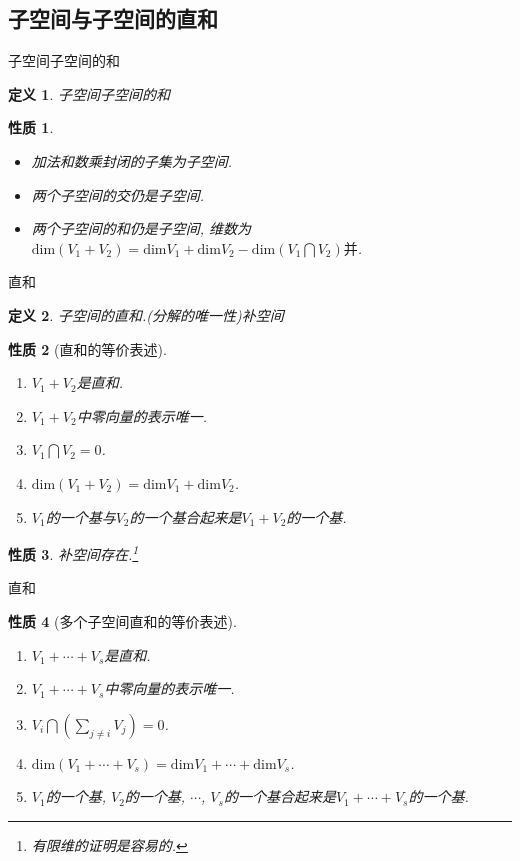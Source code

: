 \documentclass[11pt]{beamer}
\newtheorem{defi}{定义}[section]
\newtheorem{prop}{性质}[section]
\def\dim{\mathrm{dim}}
\begin{document}
\subsection{子空间与子空间的直和}
\frame{\subsectionpage}

\begin{frame}{子空间\quad 子空间的和}
	\begin{defi}
		子空间\quad 子空间的和\quad
	\end{defi}
	\begin{prop}
		\begin{itemize}
			\item 加法和数乘封闭的子集为子空间.
			\item 两个子空间的交仍是子空间.
			\item 两个子空间的和仍是子空间, 维数为$\dim (V_1+V_2)=\dim V_1+\dim V_2-\dim(V_1\bigcap V_2)并$.
		\end{itemize}
	\end{prop}
\end{frame}

\begin{frame}{直和}
\begin{defi}
	子空间的直和.(分解的唯一性)\quad 补空间
\end{defi}
\begin{prop}[直和的等价表述]
	\begin{enumerate}
		\item $V_1+V_2$是直和.
		\item $V_1+V_2$中零向量的表示唯一.
		\item $V_1\bigcap V_2=0$.
		\item $\dim (V_1+V_2)=\dim V_1+\dim V_2$.
		\item $V_1$的一个基与$V_2$的一个基合起来是$V_1+V_2$的一个基. 
	\end{enumerate}
\end{prop}
\begin{prop}
	补空间存在.\footnote{有限维的证明是容易的.}
\end{prop}
\end{frame}

\begin{frame}{直和}
\begin{prop}[多个子空间直和的等价表述]
	\begin{enumerate}
		\item $V_1+\cdots+V_s$是直和.
		\item $V_1+\cdots+V_s$中零向量的表示唯一.
		\item $V_i\bigcap \left(\sum_{j\neq i}V_j\right)=0$.
		\item $\dim (V_1+\cdots+V_s)=\dim V_1+\cdots+\dim V_s$.
		\item $V_1$的一个基, $V_2$的一个基, $\cdots$, $V_s$的一个基合起来是$V_1+\cdots+V_s$的一个基. 
	\end{enumerate}
\end{prop}
\end{frame}
\end{document}
